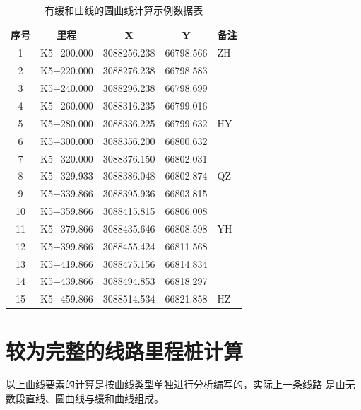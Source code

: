 \begin{table}[htbp]
    \centering
    \caption{有缓和曲线的圆曲线计算示例数据表}
    \label{tab:HYRoute}
    \begin{tabular}{ccccl}
        \hline
        序号 & 里程         & X           & Y         & 备注 \\
        \hline
        1  & K5+200.000 & 3088256.238 & 66798.566 & ZH \\
        2  & K5+220.000 & 3088276.238 & 66798.583 &    \\
        3  & K5+240.000 & 3088296.238 & 66798.699 &    \\
        4  & K5+260.000 & 3088316.235 & 66799.016 &    \\
        5  & K5+280.000 & 3088336.225 & 66799.632 & HY \\
        6  & K5+300.000 & 3088356.200 & 66800.632 &    \\
        7  & K5+320.000 & 3088376.150 & 66802.031 &    \\
        8  & K5+329.933 & 3088386.048 & 66802.874 & QZ \\
        9  & K5+339.866 & 3088395.936 & 66803.815 &    \\
        10 & K5+359.866 & 3088415.815 & 66806.008 &    \\
        11 & K5+379.866 & 3088435.646 & 66808.598 & YH \\
        12 & K5+399.866 & 3088455.424 & 66811.568 &    \\
        13 & K5+419.866 & 3088475.156 & 66814.834 &    \\
        14 & K5+439.866 & 3088494.853 & 66818.297 &    \\
        15 & K5+459.866 & 3088514.534 & 66821.858 & HZ \\
        \hline
    \end{tabular}

\end{table}

\section{较为完整的线路里程桩计算}

以上曲线要素的计算是按曲线类型单独进行分析编写的，实际上一条线路
是由无数段直线、圆曲线与缓和曲线组成。


